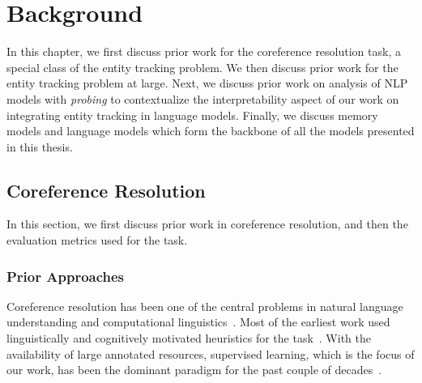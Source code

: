\documentclass[12pt]{thesis-umich}[thesis]
\begin{document}
  \newpage
\chapter{Background}

In this chapter, 
we first discuss prior work for the coreference resolution task, a special class of the entity tracking problem. 
We then discuss prior work for the entity tracking problem at large. 
Next, we discuss prior work on analysis of NLP models with \emph{probing} to contextualize the interpretability aspect of our work on integrating entity tracking in language models.   
Finally, we discuss memory models and language models which form the backbone of all the models presented in this thesis.



\label{sec:preliminaries}
				
		


\section{Coreference Resolution}
\label{sec:coref_background}
In this section, we first discuss prior work in coreference resolution, and then the evaluation metrics used for the task. 









\subsection{Prior Approaches}
\label{sec:coref_prior}
Coreference resolution has been one of the central problems in natural language understanding and  computational linguistics~\citep{Winograd1972Understanding, charniak72thesis}. Most of the earliest work used linguistically and cognitively motivated heuristics for the task~\citep{Hobbs1978ResolvingPR, brennan87centering, Carter1987InterpretingAI}. 
With the availability of large annotated resources, supervised learning, which is the focus of our work, has been the dominant paradigm for the past couple of decades~\citep{mccarthy95decision, ge-etal-1998-statistical, soon-etal-2001-machine, bengtson-roth-2008-understanding, durrett2013easy, wiseman-etal-2015-learning, lee-etal-2017-end, joshi-etal-2019-bert}. 
\end{document}
